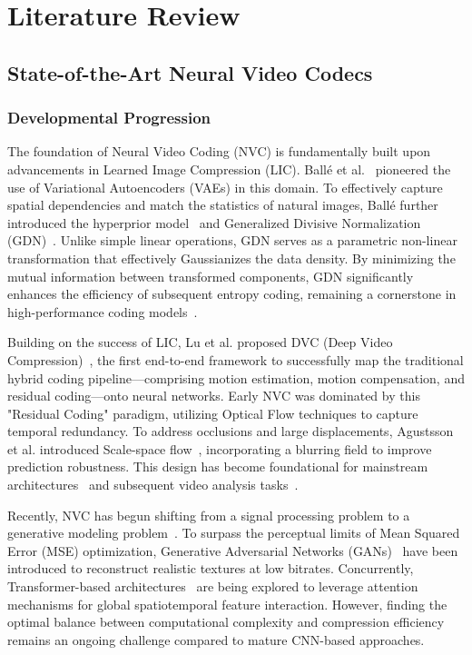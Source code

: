 
\chapter{Literature Review}

\section{State-of-the-Art Neural Video Codecs}

\subsection{Developmental Progression}

The foundation of Neural Video Coding (NVC) is fundamentally built upon advancements in Learned Image Compression (LIC). Ballé et al.~\cite{34} pioneered the use of Variational Autoencoders (VAEs) in this domain. To effectively capture spatial dependencies and match the statistics of natural images, Ballé further introduced the hyperprior model~\parencite{21, 63} and Generalized Divisive Normalization (GDN)~\cite{65}. Unlike simple linear operations, GDN serves as a parametric non-linear transformation that effectively Gaussianizes the data density. By minimizing the mutual information between transformed components, GDN significantly enhances the efficiency of subsequent entropy coding, remaining a cornerstone in high-performance coding models~\parencite{25}.

Building on the success of LIC, Lu et al. proposed DVC (Deep Video Compression)~\parencite{17, 18}, the first end-to-end framework to successfully map the traditional hybrid coding pipeline—comprising motion estimation, motion compensation, and residual coding—onto neural networks. Early NVC was dominated by this "Residual Coding" paradigm, utilizing Optical Flow techniques to capture temporal redundancy. To address occlusions and large displacements, Agustsson et al. introduced Scale-space flow~\parencite{03, 27, 35}, incorporating a blurring field to improve prediction robustness. This design has become foundational for mainstream architectures~\parencite{31, 40} and subsequent video analysis tasks~\parencite{41, 32}.

Recently, NVC has begun shifting from a signal processing problem to a generative modeling problem~\cite{58}. To surpass the perceptual limits of Mean Squared Error (MSE) optimization, Generative Adversarial Networks (GANs)~\parencite{GAN, 42} have been introduced to reconstruct realistic textures at low bitrates. Concurrently, Transformer-based architectures~\parencite{attention, 61, 07, 08, 19} are being explored to leverage attention mechanisms for global spatiotemporal feature interaction. However, finding the optimal balance between computational complexity and compression efficiency remains an ongoing challenge compared to mature CNN-based approaches.

